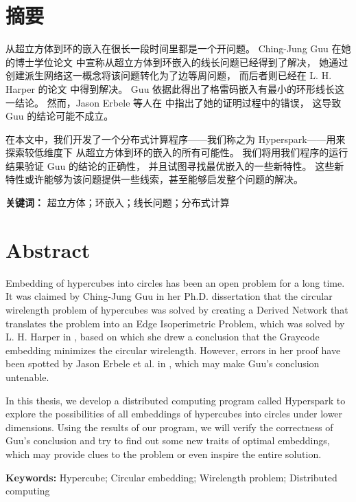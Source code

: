 
\chapter*{摘要}
\label{Abstract CN}

从超立方体到环的嵌入在很长一段时间里都是一个开问题。
Ching-Jung Guu 在她的博士学位论文 \cite{Guu.1997} 中宣称从超立方体到环嵌入的线长问题已经得到了解决，
她通过创建派生网络这一概念将该问题转化为了边等周问题，
而后者则已经在 L. H. Harper 的论文 \cite{Harper.1964} 中得到解决。
Guu 依据此得出了格雷码嵌入有最小的环形线长这一结论。
然而，Jason Erbele 等人在 \cite{Erbele.2003} 中指出了她的证明过程中的错误，
这导致 Guu 的结论可能不成立。

在本文中，我们开发了一个分布式计算程序——我们称之为 Hyperspark——用来探索较低维度下
从超立方体到环的嵌入的所有可能性。
我们将用我们程序的运行结果验证 Guu 的结论的正确性，
并且试图寻找最优嵌入的一些新特性。
这些新特性或许能够为该问题提供一些线索，甚至能够启发整个问题的解决。
\hfill\break

\textbf{关键词：} 超立方体；环嵌入；线长问题；分布式计算

\chapter*{Abstract}
\label{Abstract EN}

Embedding of hypercubes into circles has been an open problem for a long time.
It was claimed by Ching-Jung Guu in her Ph.D. dissertation \cite{Guu.1997} that
the circular wirelength problem of hypercubes was solved by creating a Derived
Network that translates the problem into an Edge Isoperimetric Problem,
which was solved by L. H. Harper in \cite{Harper.1964}, based on which
she drew a conclusion that the Graycode embedding minimizes the circular wirelength.
However, errors in her proof have been spotted by Jason Erbele et al. in \cite{Erbele.2003},
which may make Guu's conclusion untenable.

In this thesis, we develop a distributed computing program called Hyperspark to
explore the possibilities of all embeddings of hypercubes into circles under lower dimensions.
Using the results of our program, we will verify the correctness of Guu's conclusion
and try to find out some new traits of optimal embeddings,
which may provide clues to the problem or even inspire the entire solution.
\hfill\break

\textbf{Keywords:} Hypercube; Circular embedding; Wirelength problem;
Distributed computing
